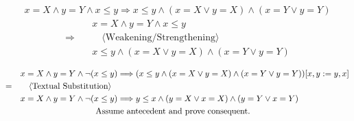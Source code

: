 \documentclass{article}
\begin{document}
\begin{gather*}
    x = X \land y = Y \land x \leq y \Longrightarrow x \leq y \land (x = X \vee y = X) \land (x = Y \vee y = Y)
\end{gather*}
\begin{align*}
    & \quad x = X \land y = Y \land x \leq y \\
    \Longrightarrow & \qquad \langle \text{Weakening/Strengthening} \rangle \\
     & \quad x \leq y \land (x = X \vee y = X) \land (x = Y \vee y = Y) \\
\end{align*}    
    \begin{align*}
        & \quad x = X \land y = Y \land \neg(x \leq y) \Longrightarrow (x \leq y \land (x = X \vee y = X) \land (x = Y \vee y = Y))[x, y := y, x] \\
        = & \qquad \langle \text{Textual Substitution} \rangle \\
        & \quad x = X \land y = Y \land \neg(x \leq y) \Longrightarrow y \leq x \land (y = X \vee x = X) \land (y = Y \vee x = Y) \\
        & \hspace{35mm} \text{Assume antecedent and prove consequent.} 
    \end{align*}
\end{document}
